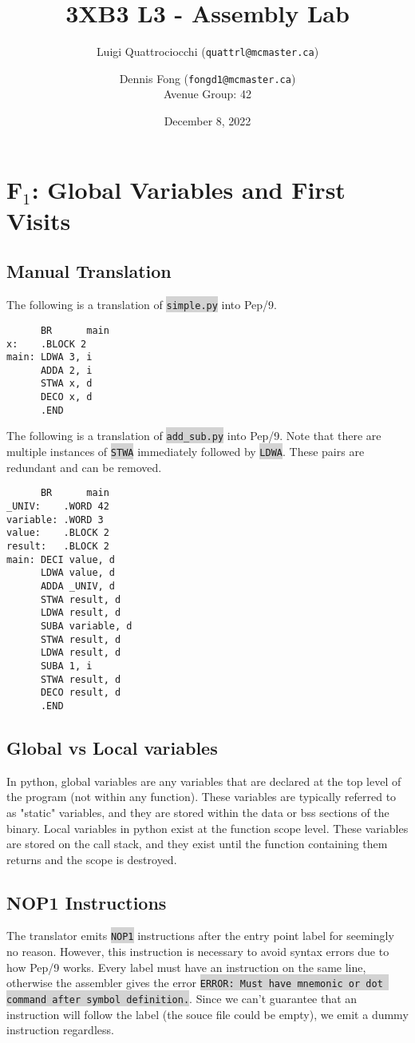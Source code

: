 \documentclass[12pt]{article}
\title{3XB3 L3 - Assembly Lab}
\author{Luigi Quattrociocchi (\texttt{quattrl@mcmaster.ca}) \and
\vspace{0.4cm}Dennis Fong (\texttt{fongd1@mcmaster.ca})\\
Avenue Group: 42}
\date{December 8, 2022}
\newcommand{\code}[1]{\colorbox{LightGray}{\texttt{#1}}}
\begin{document}
\thispagestyle{empty}
\maketitle
\clearpage

\section*{F$_1$: Global Variables and First Visits}
\subsection*{Manual Translation}
The following is a translation of \code{simple.py} into Pep/9.
\begin{verbatim}
      BR      main
x:    .BLOCK 2
main: LDWA 3, i
      ADDA 2, i
      STWA x, d
      DECO x, d
      .END
\end{verbatim}
The following is a translation of \code{add\_sub.py} into Pep/9. Note that there are multiple instances of \code{STWA} immediately followed by \code{LDWA}. These pairs are redundant and can be removed.
\begin{verbatim}
      BR      main
_UNIV:    .WORD 42
variable: .WORD 3
value:    .BLOCK 2
result:   .BLOCK 2
main: DECI value, d
      LDWA value, d
      ADDA _UNIV, d
      STWA result, d
      LDWA result, d
      SUBA variable, d
      STWA result, d
      LDWA result, d
      SUBA 1, i
      STWA result, d
      DECO result, d
      .END
\end{verbatim}
\subsection*{Global vs Local variables}
In python, global variables are any variables that are declared at the top level of the program (not within any function). These variables are typically referred to as "static" variables, and they are stored within the data or bss sections of the binary. Local variables in python exist at the function scope level. These variables are stored on the call stack, and they exist until the function containing them returns and the scope is destroyed.

\subsection*{NOP1 Instructions}
The translator emits \code{NOP1} instructions after the entry point label for seemingly no reason. However, this instruction is necessary to avoid syntax errors due to how Pep/9 works. Every label must have an instruction on the same line, otherwise the assembler gives the error \code{ERROR: Must have mnemonic or dot command after symbol definition.}. Since we can't guarantee that an instruction will follow the label (the souce file could be empty), we emit a dummy instruction regardless.
\end{document}

